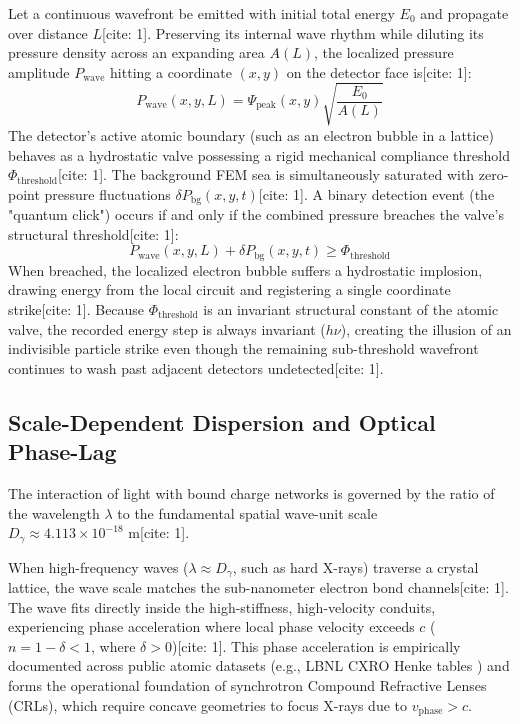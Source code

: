\documentclass[11pt,a4paper]{article}
\begin{document}
	Let a continuous wavefront be emitted with initial total energy $E_0$ and propagate over distance $L$[cite: 1]. Preserving its internal wave rhythm while diluting its pressure density across an expanding area $A(L)$, the localized pressure amplitude $P_{\text{wave}}$ hitting a coordinate $(x,y)$ on the detector face is[cite: 1]:
	\begin{equation}
		P_{\text{wave}}(x,y,L) = \Psi_{\text{peak}}(x,y) \sqrt{\frac{E_0}{A(L)}}
	\end{equation}
	The detector's active atomic boundary (such as an electron bubble in a lattice) behaves as a hydrostatic valve possessing a rigid mechanical compliance threshold $\Phi_{\text{threshold}}$[cite: 1]. The background FEM sea is simultaneously saturated with zero-point pressure fluctuations $\delta P_{\text{bg}}(x,y,t)$[cite: 1]. A binary detection event (the "quantum click") occurs if and only if the combined pressure breaches the valve's structural threshold[cite: 1]:
	\begin{equation}
		P_{\text{wave}}(x,y,L) + \delta P_{\text{bg}}(x,y,t) \ge \Phi_{\text{threshold}}
	\end{equation}
	When breached, the localized electron bubble suffers a hydrostatic implosion, drawing energy from the local circuit and registering a single coordinate strike[cite: 1]. Because $\Phi_{\text{threshold}}$ is an invariant structural constant of the atomic valve, the recorded energy step is always invariant ($h\nu$), creating the illusion of an indivisible particle strike even though the remaining sub-threshold wavefront continues to wash past adjacent detectors undetected[cite: 1].
	
	\subsection{Scale-Dependent Dispersion and Optical Phase-Lag}
	The interaction of light with bound charge networks is governed by the ratio of the wavelength $\lambda$ to the fundamental spatial wave-unit scale $D_\gamma \approx 4.113 \times 10^{-18}\text{ m}$[cite: 1]. 
	
	When high-frequency waves ($\lambda \approx D_\gamma$, such as hard X-rays) traverse a crystal lattice, the wave scale matches the sub-nanometer electron bond channels[cite: 1]. The wave fits directly inside the high-stiffness, high-velocity conduits, experiencing phase acceleration where local phase velocity exceeds $c$ ($n = 1 - \delta < 1$, where $\delta > 0$)[cite: 1]. This phase acceleration is empirically documented across public atomic datasets (e.g., LBNL CXRO Henke tables \cite{henke1993}) and forms the operational foundation of synchrotron Compound Refractive Lenses (CRLs), which require concave geometries to focus X-rays due to $v_{\text{phase}} > c$.
	
\end{document}
